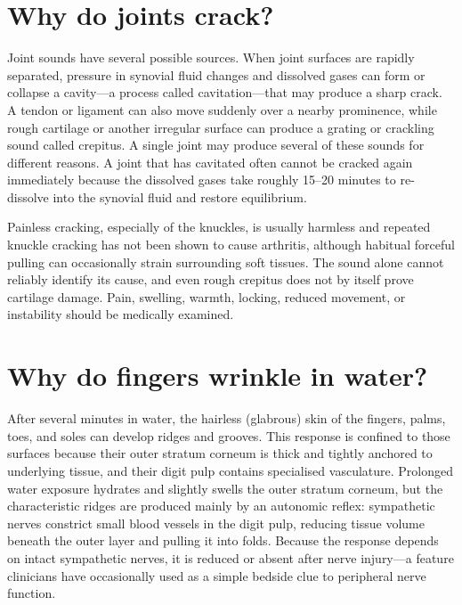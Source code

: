 \documentclass[11pt,oneside]{report}
\begin{document}
\section{Why do joints crack?}

Joint sounds have several possible sources. When joint surfaces are rapidly
separated, pressure in synovial fluid changes and dissolved gases can form or
collapse a cavity---a process called cavitation---that may produce a sharp
crack. A tendon or ligament can also move suddenly over a nearby prominence,
while rough cartilage or another irregular surface can produce a grating or
crackling sound called crepitus. A single joint may produce several of these
sounds for different reasons. A joint that has cavitated often cannot be cracked again immediately because the
dissolved gases take roughly 15--20 minutes to re-dissolve into the synovial
fluid and restore equilibrium.

Painless cracking, especially of the knuckles, is usually harmless and repeated
knuckle cracking has not been shown to cause arthritis, although habitual
forceful pulling can occasionally strain surrounding soft tissues. The sound
alone cannot reliably identify its cause, and even rough crepitus does not by
itself prove cartilage damage. Pain, swelling, warmth, locking, reduced
movement, or instability should be medically examined.

\section{Why do fingers wrinkle in water?}

After several minutes in water, the hairless (glabrous) skin of the fingers,
palms, toes, and soles can develop ridges and grooves. This response is
confined to those surfaces because their outer stratum corneum is thick and
tightly anchored to underlying tissue, and their digit pulp contains
specialised vasculature. Prolonged water exposure hydrates and slightly swells
the outer stratum corneum, but the characteristic ridges are produced mainly by
an autonomic reflex: sympathetic nerves constrict small blood vessels in the
digit pulp, reducing tissue volume beneath the outer layer and pulling it into
folds. Because the response depends on intact sympathetic nerves, it is reduced
or absent after nerve injury---a feature clinicians have occasionally used as a
simple bedside clue to peripheral nerve function.
\end{document}
